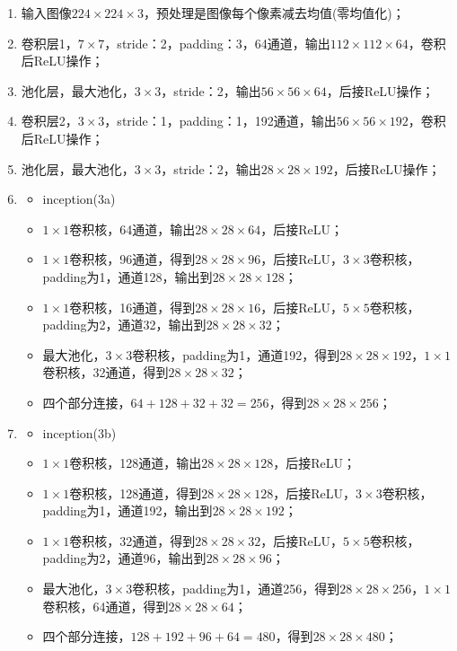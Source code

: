 \begin{enumerate}
	\item 输入图像$224\times224\times3$，预处理是图像每个像素减去均值(零均值化)；
	\item 卷积层1，$7\times7$，stride：2，padding：3，64通道，输出$112\times112\times64$，卷积后ReLU操作；
	\item 池化层，最大池化，$3\times3$，stride：2，输出$56\times56\times64$，后接ReLU操作；
	\item 卷积层2，$3\times3$，stride：1，padding：1，192通道，输出$56\times56\times192$，卷积后ReLU操作；
	\item 池化层，最大池化，$3\times3$，stride：2，输出$28\times28\times192$，后接ReLU操作；
	\item
	      \begin{itemize}
		      \item inception(3a)
		      \item $1\times1$卷积核，64通道，输出$28\times28\times64$，后接ReLU；
		      \item $1\times1$卷积核，96通道，得到$28\times28\times96$，后接ReLU，$3\times3$卷积核，padding为1，通道128，输出到$28\times28\times128$；
		      \item $1\times1$卷积核，16通道，得到$28\times28\times16$，后接ReLU，$5\times5$卷积核，padding为2，通道32，输出到$28\times28\times32$；
		      \item 最大池化，$3\times3$卷积核，padding为1，通道192，得到$28\times28\times192$，$1\times1$卷积核，32通道，得到$28\times28\times32$；
		      \item 四个部分连接，$64+128+32+32=256$，得到$28\times28\times256$；
	      \end{itemize}
	\item
	      \begin{itemize}
		      \item inception(3b)
		      \item $1\times1$卷积核，128通道，输出$28\times28\times128$，后接ReLU；
		      \item $1\times1$卷积核，128通道，得到$28\times28\times128$，后接ReLU，$3\times3$卷积核，padding为1，通道192，输出到$28\times28\times192$；
		      \item $1\times1$卷积核，32通道，得到$28\times28\times32$，后接ReLU，$5\times5$卷积核，padding为2，通道96，输出到$28\times28\times96$；
		      \item 最大池化，$3\times3$卷积核，padding为1，通道256，得到$28\times28\times256$，$1\times1$卷积核，64通道，得到$28\times28\times64$；
		      \item 四个部分连接，$128+192+96+64=480$，得到$28\times28\times480$；

\end{itemize}
\end{enumerate}
